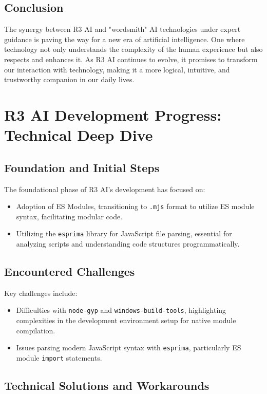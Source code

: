 \documentclass[12pt]{article}
\begin{document}
\subsection{Conclusion}

The synergy between R3 AI and "wordsmith" AI technologies under expert guidance is paving the way for a new era of artificial intelligence. One where technology not only understands the complexity of the human experience but also respects and enhances it. As R3 AI continues to evolve, it promises to transform our interaction with technology, making it a more logical, intuitive, and trustworthy companion in our daily lives.

\section*{R3 AI Development Progress: Technical Deep Dive}

\subsection*{Foundation and Initial Steps}

The foundational phase of R3 AI's development has focused on:
\begin{itemize}
    \item Adoption of ES Modules, transitioning to \texttt{.mjs} format to utilize ES module syntax, facilitating modular code.
    \item Utilizing the \texttt{esprima} library for JavaScript file parsing, essential for analyzing scripts and understanding code structures programmatically.
\end{itemize}

\subsection*{Encountered Challenges}

Key challenges include:
\begin{itemize}
    \item Difficulties with \texttt{node-gyp} and \texttt{windows-build-tools}, highlighting complexities in the development environment setup for native module compilation.
    \item Issues parsing modern JavaScript syntax with \texttt{esprima}, particularly ES module \texttt{import} statements.
\end{itemize}

\subsection*{Technical Solutions and Workarounds}
\end{document}
